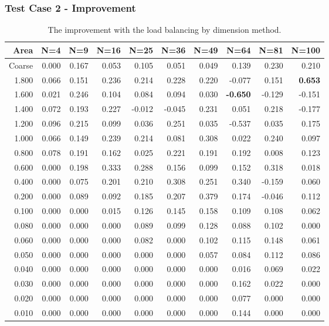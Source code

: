 \documentclass[compress]{beamer}
\begin{document}
\begin{frame}[t]\frametitle{Test Case 2 - Improvement}
\begin{table}[H]
\centering
\tiny
\caption{The improvement with the load balancing by dimension method.} 
\begin{tabular}{rrrrrrrrrr}
 \hline
 Area & N=4 & N=9 & N=16 & N=25 & N=36 & N=49 & N=64 & N=81 & N=100 \\ 
\hline
 Coarse & 0.000 & 0.167 & 0.053 &  0.105 &  0.051 & 0.049 &  0.139 &  0.230 &  0.210 \\
  1.800 & 0.066 & 0.151 & 0.236 &  0.214 &  0.228 & 0.220 & -0.077 &  0.151 &  \textbf{\cellcolor{blue!25}0.653} \\
  1.600 & 0.021 & 0.246 & 0.104 &  0.084 &  0.094 & 0.030 & \textbf{\cellcolor{blue!25}-0.650} & -0.129 & -0.151 \\
  1.400 & 0.072 & 0.193 & 0.227 & -0.012 & -0.045 & 0.231 &  0.051 &  0.218 & -0.177 \\
  1.200 & 0.096 & 0.215 & 0.099 &  0.036 &  0.251 & 0.035 & -0.537 &  0.035 &  0.175 \\
  1.000 & 0.066 & 0.149 & 0.239 &  0.214 &  0.081 & 0.308 &  0.022 &  0.240 &  0.097 \\
  0.800 & 0.078 & 0.191 & 0.162 &  0.025 &  0.221 & 0.191 &  0.192 &  0.008 &  0.123 \\
  0.600 & 0.000 & 0.198 & 0.333 &  0.288 &  0.156 & 0.099 &  0.152 &  0.318 &  0.018 \\
  0.400 & 0.000 & 0.075 & 0.201 &  0.210 &  0.308 & 0.251 &  0.340 & -0.159 &  0.060 \\
  0.200 & 0.000 & 0.089 & 0.092 &  0.185 &  0.207 & 0.379 &  0.174 & -0.046 &  0.112 \\
  0.100 & 0.000 & 0.000 & 0.015 &  0.126 &  0.145 & 0.158 &  0.109 &  0.108 &  0.062 \\
  0.080 & 0.000 & 0.000 & 0.000 &  0.089 &  0.099 & 0.128 &  0.088 &  0.102 &  0.000 \\
  0.060 & 0.000 & 0.000 & 0.000 &  0.082 &  0.000 & 0.102 &  0.115 &  0.148 &  0.061 \\
  0.050 & 0.000 & 0.000 & 0.000 &  0.000 &  0.000 & 0.057 &  0.084 &  0.112 &  0.086 \\
  0.040 & 0.000 & 0.000 & 0.000 &  0.000 &  0.000 & 0.000 &  0.016 &  0.069 &  0.022 \\
  0.030 & 0.000 & 0.000 & 0.000 &  0.000 &  0.000 & 0.000 &  0.162 &  0.022 &  0.000 \\
  0.020 & 0.000 & 0.000 & 0.000 &  0.000 &  0.000 & 0.000 &  0.077 &  0.000 &  0.000 \\
  0.010 & 0.000 & 0.000 & 0.000 &  0.000 &  0.000 & 0.000 &  0.144 &  0.000 &  0.000 \\
\hline
\end{tabular}
\end{table}
\end{frame}
\end{document}
